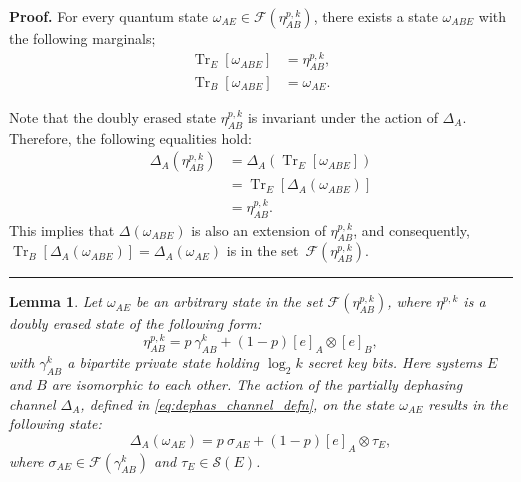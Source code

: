 \documentclass[twocolumn,letterpaper, dvipsnames,allowtoday, accepted = 2025-12-31]{quantumarticle}
\newtheorem{lemma}{Lemma}
\newenvironment{proof}[1][Proof]{\noindent\textbf{#1.} }{\ \rule{0.5em}{0.5em}}
\begin{document}
\begin{proof}
    For every quantum state $\omega_{AE} \in \mathcal{F}\!\left(\eta^{p,k}_{AB}\right)$, there exists a state $\omega_{ABE}$ with the following marginals;
    \begin{align}
        \operatorname{Tr}_E\!\left[\omega_{ABE}\right] &= \eta^{p,k}_{AB},\\
        \operatorname{Tr}_B\!\left[\omega_{ABE}\right] &= \omega_{AE}.
    \end{align}

    Note that the doubly erased state $\eta^{p,k}_{AB}$ is invariant under the action of $\Delta_A$. Therefore, the following equalities hold:
    \begin{align}
        \Delta_A\!\left(\eta^{p,k}_{AB}\right) &= \Delta_A\!\left(\operatorname{Tr}_E\!\left[\omega_{ABE}\right]\right)\\
        &= \operatorname{Tr}_E\!\left[\Delta_A\!\left(\omega_{ABE}\right)\right]\\
        &= \eta^{p,k}_{AB}.
    \end{align}
    This implies that $\Delta\!\left(\omega_{ABE}\right)$ is also an extension of $\eta^{p,k}_{AB}$, and consequently, $\operatorname{Tr}_B\!\left[\Delta_A\!\left(\omega_{ABE}\right)\right] = \Delta_A\!\left(\omega_{AE}\right)$ is in the set~$\mathcal{F}\!\left(\eta^{p,k}_{AB}\right)$.
\end{proof}

\begin{lemma}\label{lem:dephas_ext_form}
    Let $\omega_{AE}$ be an arbitrary state in the set $\mathcal{F}\!\left(\eta^{p,k}_{AB}\right)$, where $\eta^{p,k}$ is a doubly erased state of the following form:
    \begin{equation}
        \eta^{p,k}_{AB} = p~\gamma^k_{AB} + (1-p)[e]_A\otimes[e]_B,
    \end{equation}
    with $\gamma^k_{AB}$ a bipartite private state holding $\log_2 k$ secret key bits. Here systems $E$ and $B$ are isomorphic to each other.
    The action of the partially dephasing channel $\Delta_A$, defined in \eqref{eq:dephas_channel_defn}, on the state $\omega_{AE}$ results in the following state:
    \begin{equation}
    \Delta_A\!\left(\omega_{AE}\right) = p~\sigma_{AE} + (1-p)[e]_A\otimes\tau_E,
    \end{equation}
    where $\sigma_{AE} \in \mathcal{F}\!\left(\gamma^k_{AB}\right)$ and $\tau_E \in \mathcal{S}\!\left(E\right)$.
\end{lemma}
\end{document}
